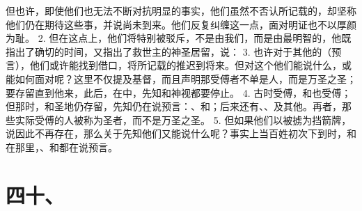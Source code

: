 但也许，即使他们也无法不断对抗明显的事实，他们虽然不否认所记载的，却坚称他们仍在期待这些事，并说尚未到来。他们反复纠缠这一点，面对明证也不以厚颜为耻。 2. 但在这点上，他们将特别被驳斥，不是由我们，而是由最明智的，他既指出了确切的时间，又指出了救世主的神圣居留，说： 3. 也许对于其他的（预言），他们或许能找到借口，将所记载的推迟到将来。但对这个他们能说什么，或能如何面对呢？这里不仅提及基督，而且声明那受傅者不单是人，而是万圣之圣；要存留直到他来，此后，在中，先知和神视都要停止。 4. 古时受傅，和也受傅；但那时，和圣地仍存留，先知仍在说预言：、和；后来还有、、及其他。再者，那些实际受傅的人被称为圣者，而不是万圣之圣。 5. 但如果他们以被掳为挡箭牌，说因此不再存在，那么关于先知他们又能说什么呢？事实上当百姓初次下到时，和在那里，、和都在说预言。\par


\section{四十、}

